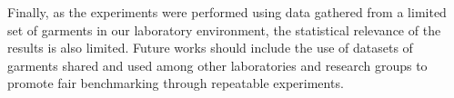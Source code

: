 Finally, as the experiments were performed using data gathered from a limited set of garments in our laboratory environment, the statistical relevance of the results is also limited. Future works should include the use of datasets of garments shared and used among other laboratories and research groups to promote fair benchmarking through repeatable experiments.


